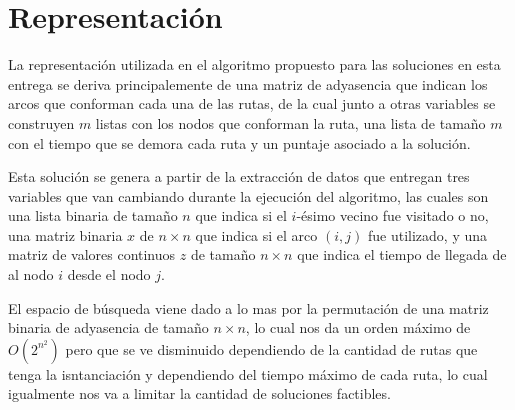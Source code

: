 \section{Representaci\'on}\label{represent}
La representaci\'on utilizada en el algoritmo propuesto para las soluciones en esta entrega se deriva principalemente de una matriz de adyasencia que indican los arcos que conforman cada una de las rutas, de la cual junto a otras variables se construyen $m$ listas con los nodos que conforman la ruta, una lista de tama\~no $m$ con el tiempo que se demora cada ruta y un puntaje asociado a la soluci\'on.

Esta soluci\'on se genera a partir de la extracci\'on de datos que entregan tres variables que van cambiando durante la ejecuci\'on del algoritmo, las cuales son una lista binaria de tama\~no $n$ que indica si el $i$-\'esimo vecino fue visitado o no, una matriz binaria $x$ de $n\times n$ que indica si el arco $(i,j)$ fue utilizado, y una matriz de valores continuos $z$ de tama\~no $n\times n$ que indica el tiempo de llegada de al nodo $i$ desde el nodo $j$.

El espacio de b\'usqueda viene dado a lo mas por la permutaci\'on de una matriz binaria de adyasencia de tama\~no $n \times n$, lo cual nos da un orden m\'aximo de $O(2^{n^2})$ pero que se ve disminuido dependiendo de la cantidad de rutas que tenga la isntanciaci\'on y dependiendo del tiempo m\'aximo de cada ruta, lo cual igualmente nos va a limitar la cantidad de soluciones factibles.
